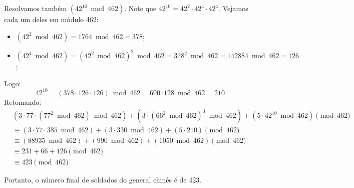 Resolvamos também $(42^{10} \bmod{462})$. Note que $42^{10} = 42^2 \cdot 42^4 \cdot 42^4$. Vejamos cada um deles em módulo 462:
\begin{itemize}
	\item $(42^2 \bmod{462}) = 1764 \bmod{462} = 378$;
	\item $(42^4 \bmod{462}) = (42^2 \bmod{462})^2 \bmod{462} = 378^2 \bmod{462} = 142884 \bmod{462} = 126$;
\end{itemize}
Logo:
\begin{displaymath}
	42^{10} = (378 \cdot 126 \cdot 126) \bmod{462} = 6001128 \bmod{462} = 210
\end{displaymath}
Retomando:
\begin{align*}
	&(3 \cdot 77 \cdot (77^2 \bmod{462}) \bmod{462}) + (3 \cdot (66^2 \bmod{462})^3 \bmod{462}) + (5 \cdot 42^{10} \bmod{462}) \pmod{462} \\ &\equiv (3 \cdot 77 \cdot 385 \bmod{462}) + (3 \cdot 330 \bmod{462}) + (5 \cdot 210) \pmod{462} \\ 
	&\equiv (88935 \bmod{462}) + (990 \bmod{462}) + (1050 \bmod{462}) \pmod{462} \\ 
	&\equiv 231 + 66 + 126 \pmod{462} \\
	&\equiv 423 \pmod{462}
\end{align*}

Portanto, o número final de soldados do general chinês é de 423.
